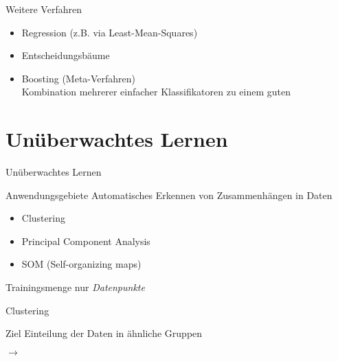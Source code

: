 \documentclass[xcolor={dvipsnames,svgnames}]{beamer}
\begin{document}
\begin{frame}{Weitere Verfahren}

  \begin{itemize}
  \item Regression (z.B. via Least-Mean-Squares)
  \item Entscheidungsbäume
  \item Boosting (Meta-Verfahren) \\
    Kombination mehrerer einfacher Klassifikatoren zu einem guten
  \end{itemize}

\end{frame}

\section{Unüberwachtes Lernen}

\begin{frame}{Unüberwachtes Lernen}
  \begin{exampleblock}{Anwendungsgebiete}
    Automatisches Erkennen von Zusammenhängen in Daten
    \begin{itemize}
    \item Clustering
    \item Principal Component Analysis
    \item SOM (Self-organizing maps)
    \end{itemize}
  \end{exampleblock}

  \begin{block}{Trainingsmenge}
    nur \textit{Datenpunkte}
  \end{block}
\end{frame}

\begin{frame}{Clustering}
  \begin{block}{Ziel}
    Einteilung der Daten in ähnliche Gruppen
  \end{block}

  
  \centering
  \begin{minipage}{0.4\linewidth}
  \end{minipage}
  \quad$\rightarrow$\quad
  \begin{minipage}{0.4\linewidth}
  \end{minipage}
\end{frame}
\end{document}
